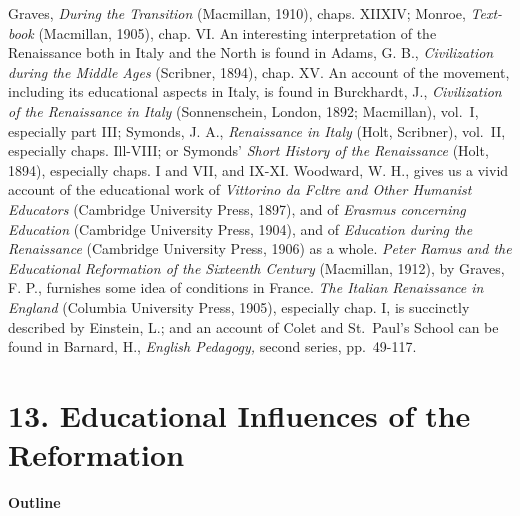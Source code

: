 \documentclass[]{book}
\begin{document}
Graves, \emph{During the Transition} (Macmillan, 1910), chaps. XIIXIV; Monroe, \emph{Text-book} (Macmillan, 1905), chap. VI. An interesting interpretation of the Renaissance both in Italy and the North is found in Adams, G. B., \emph{Civilization during the Middle Ages} (Scribner, 1894), chap. XV. An account of the movement, including its educational aspects in Italy, is found in Burckhardt, J., \emph{Civilization of the Renaissance in Italy} (Sonnenschein, London, 1892; Macmillan), vol.~I, especially part III; Symonds, J. A., \emph{Renaissance in Italy} (Holt, Scribner), vol.~II, especially chaps. Ill-VIII; or Symonds' \emph{Short History of the Renaissance} (Holt, 1894), especially chaps. I and VII, and IX-XI. Woodward, W. H., gives us a vivid account of the educational work of \emph{Vittorino da Fcltre and Other Humanist Educators} (Cambridge University Press, 1897), and of \emph{Erasmus concerning Education} (Cambridge University Press, 1904), and of \emph{Education during the Renaissance} (Cambridge University Press, 1906) as a whole. \emph{Peter Ramus and the Educational Reformation of the Sixteenth Century} (Macmillan, 1912), by Graves, F. P., furnishes some idea of conditions in France. \emph{The Italian Renaissance in England} (Columbia University Press, 1905), especially chap. I, is succinctly described by Einstein, L.; and an account of Colet and St.~Paul's School can be found in Barnard, H., \emph{English Pedagogy,} second series, pp.~49-117.

\hypertarget{educational-influences-of-the-reformation}{%
\chapter{13. Educational Influences of the Reformation}\label{educational-influences-of-the-reformation}}

\textbf{Outline}
\end{document}
